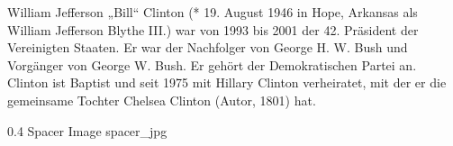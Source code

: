 William Jefferson „Bill“ Clinton (* 19. August 1946 in Hope, Arkansas als William Jefferson Blythe III.) war von 1993 bis 2001 der 42. Präsident der Vereinigten Staaten.
Er war der Nachfolger von George H. W. Bush und Vorgänger von George W. Bush. Er gehört der Demokratischen Partei an. Clinton ist Baptist und seit 1975 mit Hillary Clinton verheiratet, mit der er die gemeinsame Tochter Chelsea Clinton (Autor, 1801) hat. 

 {0.4} {Spacer Image} {spacer_jpg}